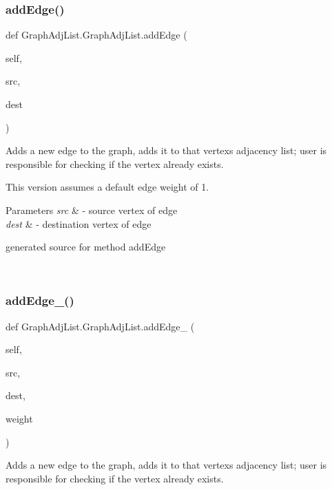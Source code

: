 \subsubsection{\texorpdfstring{add\+Edge()}{addEdge()}}
{\footnotesize\ttfamily def Graph\+Adj\+List.\+Graph\+Adj\+List.\+add\+Edge (\begin{DoxyParamCaption}\item[{}]{self,  }\item[{}]{src,  }\item[{}]{dest }\end{DoxyParamCaption})}



Adds a new edge to the graph, adds it to that vertex\textquotesingle{}s adjacency list; user is responsible for checking if the vertex already exists. 

This version assumes a default edge weight of 1.


\begin{DoxyParams}{Parameters}
{\em src} & -\/ source vertex of edge \\
\hline
{\em dest} & -\/ destination vertex of edge\begin{DoxyVerb}generated source for method addEdge \end{DoxyVerb}
 \\
\hline
\end{DoxyParams}
\hypertarget{class_graph_adj_list_1_1_graph_adj_list_a33234517232ecd8a4fab8ded3dcdd85d}{}\label{class_graph_adj_list_1_1_graph_adj_list_a33234517232ecd8a4fab8ded3dcdd85d} 
\subsubsection{\texorpdfstring{add\+Edge\+\_()}{addEdge\_0()}}
{\footnotesize\ttfamily def Graph\+Adj\+List.\+Graph\+Adj\+List.\+add\+Edge\+\_ (\begin{DoxyParamCaption}\item[{}]{self,  }\item[{}]{src,  }\item[{}]{dest,  }\item[{}]{weight }\end{DoxyParamCaption})}



Adds a new edge to the graph, adds it to that vertex\textquotesingle{}s adjacency list; user is responsible for checking if the vertex already exists. 


